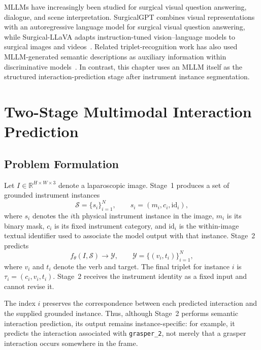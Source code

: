 MLLMs have increasingly been studied for surgical visual question answering, dialogue, and scene interpretation. SurgicalGPT combines visual representations with an autoregressive language model for surgical visual question answering, while Surgical-LLaVA adapts instruction-tuned vision--language models to surgical images and videos~\cite{seenivasan2023surgicalgpt,jin2024surgical}. Related triplet-recognition work has also used MLLM-generated semantic descriptions as auxiliary information within discriminative models~\cite{zhang2025mejo}. In contrast, this chapter uses an MLLM itself as the structured interaction-prediction stage after instrument instance segmentation.

\section{Two-Stage Multimodal Interaction Prediction}
\label{sec:c5:method}

\subsection{Problem Formulation}
\label{sec:c5:problem}

Let $I\in\mathbb{R}^{H\times W\times3}$ denote a laparoscopic image. Stage~1 produces a set of grounded instrument instances
\begin{equation}
    \mathcal{S}=\{s_i\}_{i=1}^{N}, \qquad s_i=(m_i,c_i,\mathrm{id}_i),
    \label{eq:c5:grounded-instances}
\end{equation}
where $s_i$ denotes the $i$th physical instrument instance in the image, $m_i$ is its binary mask, $c_i$ is its fixed instrument category, and $\mathrm{id}_i$ is the within-image textual identifier used to associate the model output with that instance. Stage~2 predicts
\begin{equation}
    f_{\theta}(I,\mathcal{S})\rightarrow\mathcal{Y}, \qquad
    \mathcal{Y}=\{(v_i,t_i)\}_{i=1}^{N},
    \label{eq:c5:interaction-mapping}
\end{equation}
where $v_i$ and $t_i$ denote the verb and target. The final triplet for instance $i$ is $\tau_i=(c_i,v_i,t_i)$. Stage~2 receives the instrument identity as a fixed input and cannot revise it.

The index $i$ preserves the correspondence between each predicted interaction and the supplied grounded instance. Thus, although Stage~2 performs semantic interaction prediction, its output remains instance-specific: for example, it predicts the interaction associated with \texttt{grasper\_2}, not merely that a grasper interaction occurs somewhere in the frame.


